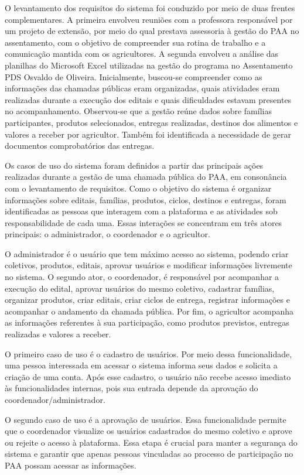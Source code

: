 O levantamento dos requisitos do sistema foi conduzido por meio de duas frentes complementares. A primeira envolveu reuniões com a professora responsável por um projeto de extensão, por meio do qual prestava assessoria à gestão do PAA no assentamento, com o objetivo de compreender sua rotina de trabalho e a comunicação mantida com os agricultores. A segunda envolveu a análise das planilhas do Microsoft Excel utilizadas na gestão do programa no Assentamento PDS Osvaldo de Oliveira. Inicialmente, buscou-se compreender como as informações das chamadas públicas eram organizadas, quais atividades eram realizadas durante a execução dos editais e quais dificuldades estavam presentes no acompanhamento. Observou-se que a gestão reúne dados sobre famílias participantes, produtos selecionados, entregas realizadas, destinos dos alimentos e valores a receber por agricultor. Também foi identificada a necessidade de gerar documentos comprobatórios das entregas.

Os casos de uso do sistema foram definidos a partir das principais ações realizadas durante a gestão de uma chamada pública do PAA, em consonância com o levantamento de requisitos. Como o objetivo do sistema é organizar informações sobre editais, famílias, produtos, ciclos, destinos e entregas, foram identificadas as pessoas que interagem com a plataforma e as atividades sob responsabilidade de cada uma. Essas interações se concentram em três atores principais: o administrador, o coordenador e o agricultor.

O administrador é o usuário que tem máximo acesso ao sistema, podendo criar coletivos, produtos, editais, aprovar usuários e modificar informações livremente no sistema. O segundo ator, o coordenador, é responsável por acompanhar a execução do edital, aprovar usuários do mesmo coletivo, cadastrar famílias, organizar produtos, criar editais, criar ciclos de entrega, registrar informações e acompanhar o andamento da chamada pública. Por fim, o agricultor acompanha as informações referentes à sua participação, como produtos previstos, entregas realizadas e valores a receber.

O primeiro caso de uso é o cadastro de usuários. Por meio dessa funcionalidade, uma pessoa interessada em acessar o sistema informa seus dados e solicita a criação de uma conta. Após esse cadastro, o usuário não recebe acesso imediato às funcionalidades internas, pois sua entrada depende da aprovação do coordenador/administrador.

O segundo caso de uso é a aprovação de usuários. Essa funcionalidade permite que o coordenador visualize os usuários cadastrados do mesmo coletivo e aprove ou rejeite o acesso à plataforma. Essa etapa é crucial para manter a segurança do sistema e garantir que apenas pessoas vinculadas ao processo de participação no PAA possam acessar as informações.

